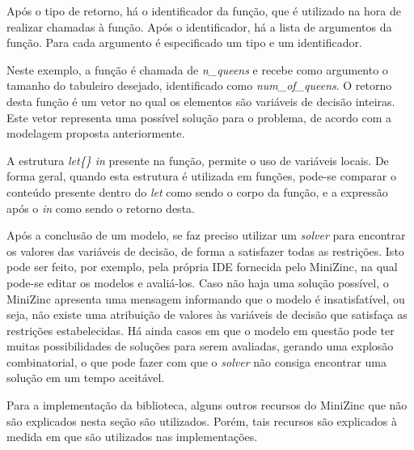 Após o tipo de retorno, há o identificador da função, que é utilizado na hora de realizar chamadas à função. Após o identificador, há a lista de argumentos da função. Para cada argumento é especificado um tipo e um identificador.

Neste exemplo, a função é chamada de \textit{n\_queens} e recebe como argumento o tamanho do tabuleiro desejado, identificado como \textit{num\_of\_queens}. O retorno desta função é um vetor no qual os elementos são variáveis de decisão inteiras. Este vetor representa uma possível solução para o problema, de acordo com a modelagem proposta anteriormente.

A estrutura \textit{let\{\} in} presente na função, permite o uso de variáveis locais. De forma geral, quando esta estrutura é utilizada em funções, pode-se comparar o conteúdo presente dentro do \textit{let} como sendo o corpo da função, e a expressão após o \textit{in} como sendo o retorno desta.

Após a conclusão de um modelo, se faz preciso utilizar um \textit{solver} para encontrar os valores das variáveis de decisão, de forma a satisfazer todas as restrições. Isto pode ser feito, por exemplo, pela própria IDE fornecida pelo MiniZinc, na qual pode-se editar os modelos e avaliá-los. Caso não haja uma solução possível, o MiniZinc apresenta uma mensagem informando que o modelo é insatisfatível, ou seja, não existe uma atribuição de valores às variáveis de decisão que satisfaça as restrições estabelecidas. Há ainda casos em que o modelo em questão pode ter muitas possibilidades de soluções para serem avaliadas, gerando uma explosão combinatorial, o que pode fazer com que o \textit{solver} não consiga encontrar uma solução em um tempo aceitável.

Para a implementação da biblioteca, alguns outros recursos do MiniZinc que não são explicados nesta seção são utilizados. Porém, tais recursos são explicados à medida em que são utilizados nas implementações.
